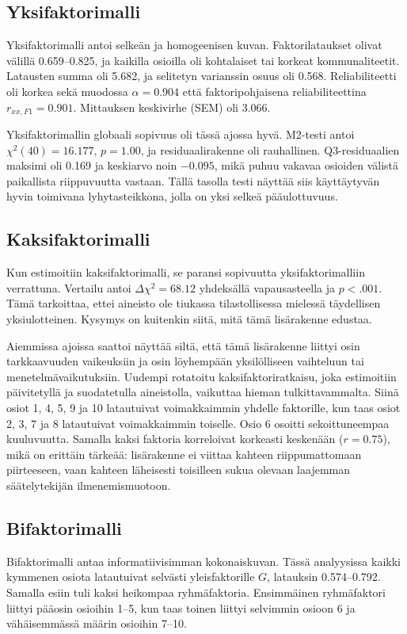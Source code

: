 \documentclass[11pt,a4paper]{article}
\begin{document}
\subsection{Yksifaktorimalli}
Yksifaktorimalli antoi selkeän ja homogeenisen kuvan. Faktorilataukset olivat välillä 0.659--0.825, ja kaikilla osioilla oli kohtalaiset tai korkeat kommunaliteetit. Latausten summa oli 5.682, ja selitetyn varianssin osuus oli 0.568. Reliabiliteetti oli korkea sekä muodossa $\alpha = 0.904$ että faktoripohjaisena reliabiliteettina $r_{xx,F1} = 0.901$. Mittauksen keskivirhe (SEM) oli 3.066.

Yksifaktorimallin globaali sopivuus oli tässä ajossa hyvä. M2-testi antoi $\chi^2(40)=16.177$, $p=1.00$, ja residuaalirakenne oli rauhallinen. Q3-residuaalien maksimi oli 0.169 ja keskiarvo noin $-0.095$, mikä puhuu vakavaa osioiden välistä paikallista riippuvuutta vastaan. Tällä tasolla testi näyttää siis käyttäytyvän hyvin toimivana lyhytasteikkona, jolla on yksi selkeä pääulottuvuus.

\subsection{Kaksifaktorimalli}
Kun estimoitiin kaksifaktorimalli, se paransi sopivuutta yksifaktorimalliin verrattuna. Vertailu antoi $\Delta \chi^2 = 68.12$ yhdeksällä vapausasteella ja $p < .001$. Tämä tarkoittaa, ettei aineisto ole tiukassa tilastollisessa mielessä täydellisen yksiulotteinen. Kysymys on kuitenkin siitä, mitä tämä lisärakenne edustaa.

Aiemmissa ajoissa saattoi näyttää siltä, että tämä lisärakenne liittyi osin tarkkaavuuden vaikeuksiin ja osin löyhempään yksilölliseen vaihteluun tai menetelmävaikutuksiin. Uudempi rotatoitu kaksifaktoriratkaisu, joka estimoitiin päivitetyllä ja suodatetulla aineistolla, vaikuttaa hieman tulkittavammalta. Siinä osiot 1, 4, 5, 9 ja 10 latautuivat voimakkaimmin yhdelle faktorille, kun taas osiot 2, 3, 7 ja 8 latautuivat voimakkaimmin toiselle. Osio 6 osoitti sekoittuneempaa kuuluvuutta. Samalla kaksi faktoria korreloivat korkeasti keskenään ($r = 0.75$), mikä on erittäin tärkeää: lisärakenne ei viittaa kahteen riippumattomaan piirteeseen, vaan kahteen läheisesti toisilleen sukua olevaan laajemman säätelytekijän ilmenemismuotoon.

\subsection{Bifaktorimalli}
Bifaktorimalli antaa informatiivisimman kokonaiskuvan. Tässä analyysissa kaikki kymmenen osiota latautuivat selvästi yleisfaktorille $G$, latauksin 0.574--0.792. Samalla esiin tuli kaksi heikompaa ryhmäfaktoria. Ensimmäinen ryhmäfaktori liittyi pääosin osioihin 1--5, kun taas toinen liittyi selvimmin osioon 6 ja vähäisemmässä määrin osioihin 7--10.
\end{document}

